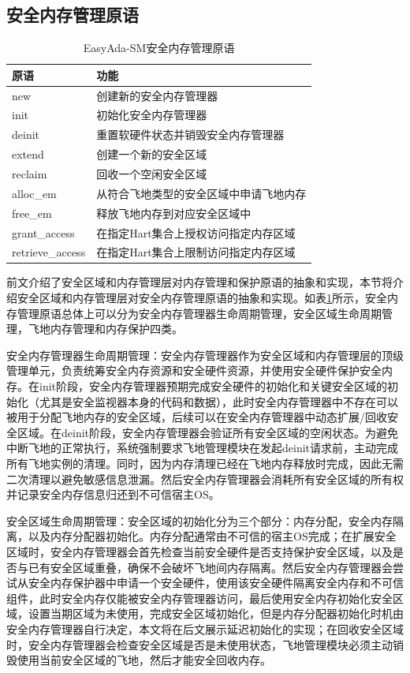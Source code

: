 \documentclass[master, vlined, review]{DissertUESTC}
\begin{document}
	\subsection{安全内存管理原语}
	\begin{table}[!ht]
		\caption{EasyAda-SM安全内存管理原语}
		\label{secmemmgr}
		\begin{tabular}{p{3cm} <{\centering} p{10cm}<{\centering}}
			\toprule
			原语 & 功能 \\
			\midrule
			new &  创建新的安全内存管理器\\
			init &  初始化安全内存管理器\\
			deinit &  重置软硬件状态并销毁安全内存管理器\\
			extend &  创建一个新的安全区域\\
			reclaim &  回收一个空闲安全区域\\
			alloc\_em &  从符合飞地类型的安全区域中申请飞地内存\\
			free\_em &  释放飞地内存到对应安全区域中\\
			grant\_access & 在指定Hart集合上授权访问指定内存区域 \\
			retrieve\_access & 在指定Hart集合上限制访问指定内存区域 \\
			\bottomrule
		\end{tabular}
	\end{table}
	
	前文介绍了安全区域和内存管理层对内存管理和保护原语的抽象和实现，本节将介绍安全区域和内存管理层对安全内存管理原语的抽象和实现。如表\ref{secmemmgr}所示，安全内存管理原语总体上可以分为安全内存管理器生命周期管理，安全区域生命周期管理，飞地内存管理和内存保护四类。
	
	安全内存管理器生命周期管理：安全内存管理器作为安全区域和内存管理层的顶级管理单元，负责统筹安全内存资源和安全硬件资源，并使用安全硬件保护安全内存。在init阶段，安全内存管理器预期完成安全硬件的初始化和关键安全区域的初始化（尤其是安全监视器本身的代码和数据），此时安全内存管理器中不存在可以被用于分配飞地内存的安全区域，后续可以在安全内存管理器中动态扩展/回收安全区域。在deinit阶段，安全内存管理器会验证所有安全区域的空闲状态。为避免中断飞地的正常执行，系统强制要求飞地管理模块在发起deinit请求前，主动完成所有飞地实例的清理。同时，因为内存清理已经在飞地内存释放时完成，因此无需二次清理以避免敏感信息泄漏。然后安全内存管理器会消耗所有安全区域的所有权并记录安全内存信息归还到不可信宿主OS。
	
	安全区域生命周期管理：安全区域的初始化分为三个部分：内存分配，安全内存隔离，以及内存分配器初始化。内存分配通常由不可信的宿主OS完成；在扩展安全区域时，安全内存管理器会首先检查当前安全硬件是否支持保护安全区域，以及是否与已有安全区域重叠，确保不会破坏飞地间内存隔离。然后安全内存管理器会尝试从安全内存保护器中申请一个安全硬件，使用该安全硬件隔离安全内存和不可信组件，此时安全内存仅能被安全内存管理器访问，最后使用安全内存初始化安全区域，设置当期区域为未使用，完成安全区域初始化，但是内存分配器初始化时机由安全内存管理器自行决定，本文将在后文展示延迟初始化的实现；在回收安全区域时，安全内存管理器会检查安全区域是否是未使用状态，飞地管理模块必须主动销毁使用当前安全区域的飞地，然后才能安全回收内存。
	
\end{document}
